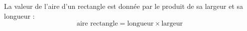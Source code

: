 La valeur de l'aire d'un rectangle est donnée par le produit de sa largeur 
et sa longueur :
$$\text{aire rectangle}=\text{longueur}\times\text{largeur}$$
